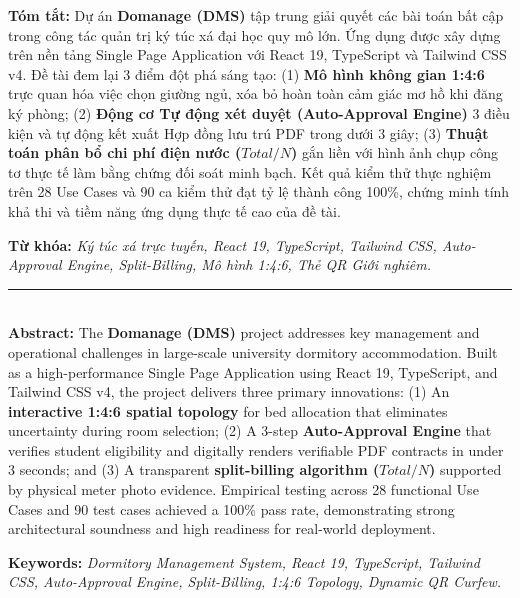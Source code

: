 \documentclass[12pt,a4paper,oneside]{report}
\begin{document}
\textbf{Tóm tắt:} Dự án \textbf{Domanage (DMS)} tập trung giải quyết các bài toán bất cập trong công tác quản trị ký túc xá đại học quy mô lớn. Ứng dụng được xây dựng trên nền tảng Single Page Application với React 19, TypeScript và Tailwind CSS v4. Đề tài đem lại 3 điểm đột phá sáng tạo: (1) \textbf{Mô hình không gian 1:4:6} trực quan hóa việc chọn giường ngủ, xóa bỏ hoàn toàn cảm giác mơ hồ khi đăng ký phòng; (2) \textbf{Động cơ Tự động xét duyệt (Auto-Approval Engine)} 3 điều kiện và tự động kết xuất Hợp đồng lưu trú PDF trong dưới 3 giây; (3) \textbf{Thuật toán phân bổ chi phí điện nước ($Total / N$)} gắn liền với hình ảnh chụp công tơ thực tế làm bằng chứng đối soát minh bạch. Kết quả kiểm thử thực nghiệm trên 28 Use Cases và 90 ca kiểm thử đạt tỷ lệ thành công 100\%, chứng minh tính khả thi và tiềm năng ứng dụng thực tế cao của đề tài.

\vspace{0.8cm}
\noindent \textbf{Từ khóa:} \textit{Ký túc xá trực tuyến, React 19, TypeScript, Tailwind CSS, Auto-Approval Engine, Split-Billing, Mô hình 1:4:6, Thẻ QR Giới nghiêm.}

\vspace{1.5cm}
\noindent \rule{\textwidth}{0.5pt}\\[0.5cm]

\textbf{Abstract:} The \textbf{Domanage (DMS)} project addresses key management and operational challenges in large-scale university dormitory accommodation. Built as a high-performance Single Page Application using React 19, TypeScript, and Tailwind CSS v4, the project delivers three primary innovations: (1) An \textbf{interactive 1:4:6 spatial topology} for bed allocation that eliminates uncertainty during room selection; (2) A 3-step \textbf{Auto-Approval Engine} that verifies student eligibility and digitally renders verifiable PDF contracts in under 3 seconds; and (3) A transparent \textbf{split-billing algorithm ($Total / N$)} supported by physical meter photo evidence. Empirical testing across 28 functional Use Cases and 90 test cases achieved a 100\% pass rate, demonstrating strong architectural soundness and high readiness for real-world deployment.

\vspace{0.8cm}
\noindent \textbf{Keywords:} \textit{Dormitory Management System, React 19, TypeScript, Tailwind CSS, Auto-Approval Engine, Split-Billing, 1:4:6 Topology, Dynamic QR Curfew.}

\newpage
\tableofcontents
\end{document}
